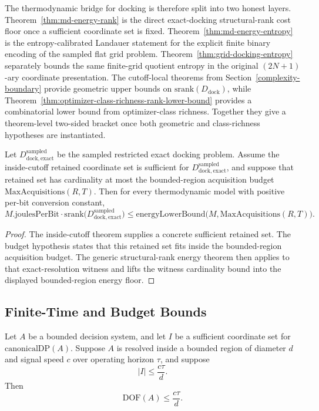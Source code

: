 The thermodynamic bridge for docking is therefore split into two honest layers. Theorem~\ref{thm:md-energy-rank} is the direct exact-docking structural-rank cost floor once a sufficient coordinate set is fixed. Theorem~\ref{thm:md-energy-entropy} is the entropy-calibrated Landauer statement for the explicit finite binary encoding of the sampled flat grid problem. Theorem~\ref{thm:grid-docking-entropy} separately bounds the same finite-grid quotient entropy in the original $(2N+1)$-ary coordinate presentation. The cutoff-local theorems from Section~\ref{complexity-boundary} provide geometric upper bounds on $\mathrm{srank}(D_{\mathrm{dock}})$, while Theorem~\ref{thm:optimizer-class-richness-rank-lower-bound} provides a combinatorial lower bound from optimizer-class richness. Together they give a theorem-level two-sided bracket once both geometric and class-richness hypotheses are instantiated.

\begin{theorem}\label{thm:sampled-inside-cutoff-budget-energy}
Let $D^{\mathrm{sampled}}_{\mathrm{dock,exact}}$ be the sampled restricted exact docking problem. Assume the inside-cutoff retained coordinate set is sufficient for $D^{\mathrm{sampled}}_{\mathrm{dock,exact}}$, and suppose that retained set has cardinality at most the bounded-region acquisition budget $\mathrm{MaxAcquisitions}(R,T)$. Then for every thermodynamic model with positive per-bit conversion constant,
\[
M.\mathrm{joulesPerBit}\cdot \mathrm{srank}\!\bigl(D^{\mathrm{sampled}}_{\mathrm{dock,exact}}\bigr)
\le
\mathrm{energyLowerBound}\!\bigl(M,\mathrm{MaxAcquisitions}(R,T)\bigr).
\]
\end{theorem}

\begin{proof}
The inside-cutoff theorem supplies a concrete sufficient retained set. The budget hypothesis states that this retained set fits inside the bounded-region acquisition budget. The generic structural-rank energy theorem then applies to that exact-resolution witness and lifts the witness cardinality bound into the displayed bounded-region energy floor.
\end{proof}

\subsection{Finite-Time and Budget Bounds}

\begin{theorem}\label{thm:time-lower-bound}
Let $A$ be a bounded decision system, and let $I$ be a sufficient coordinate set for $\mathrm{canonicalDP}(A)$. Suppose $A$ is resolved inside a bounded region of diameter $d$ and signal speed $c$ over operating horizon $\tau$, and suppose
\[
|I| \le \frac{c\tau}{d}.
\]
Then
\[
\mathrm{DOF}(A) \le \frac{c\tau}{d}.
\]
\end{theorem}

